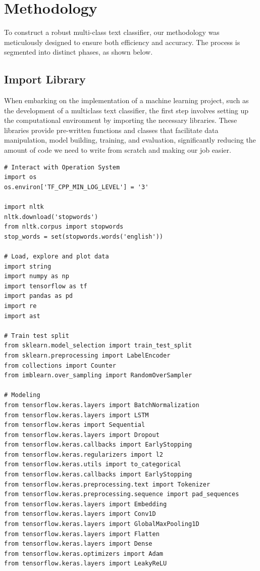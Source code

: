 \section{Methodology}

To construct a robust multi-class text classifier, our methodology was meticulously designed to ensure both efficiency and accuracy. The process is segmented into distinct phases, as shown below.

\subsection{Import Library}
When embarking on the implementation of a machine learning project, such as the development of a multiclass text classifier, the first step involves setting up the computational environment by importing the necessary libraries. These libraries provide pre-written functions and classes that facilitate data manipulation, model building, training, and evaluation, significantly reducing the amount of code we need to write from scratch and making our job easier.

\begin{lstlisting}
# Interact with Operation System
import os
os.environ['TF_CPP_MIN_LOG_LEVEL'] = '3'

import nltk
nltk.download('stopwords')
from nltk.corpus import stopwords
stop_words = set(stopwords.words('english'))

# Load, explore and plot data
import string
import numpy as np
import tensorflow as tf
import pandas as pd
import re
import ast

# Train test split
from sklearn.model_selection import train_test_split
from sklearn.preprocessing import LabelEncoder
from collections import Counter
from imblearn.over_sampling import RandomOverSampler

# Modeling
from tensorflow.keras.layers import BatchNormalization
from tensorflow.keras.layers import LSTM
from tensorflow.keras import Sequential
from tensorflow.keras.layers import Dropout
from tensorflow.keras.callbacks import EarlyStopping
from tensorflow.keras.regularizers import l2
from tensorflow.keras.utils import to_categorical
from tensorflow.keras.callbacks import EarlyStopping
from tensorflow.keras.preprocessing.text import Tokenizer
from tensorflow.keras.preprocessing.sequence import pad_sequences
from tensorflow.keras.layers import Embedding
from tensorflow.keras.layers import Conv1D
from tensorflow.keras.layers import GlobalMaxPooling1D
from tensorflow.keras.layers import Flatten
from tensorflow.keras.layers import Dense
from tensorflow.keras.optimizers import Adam
from tensorflow.keras.layers import LeakyReLU
\end{lstlisting}

